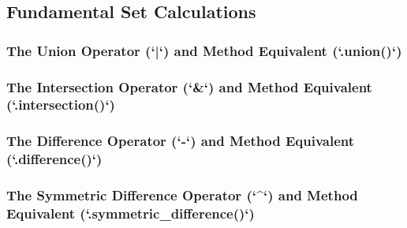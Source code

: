 \subsection{Fundamental Set Calculations}
\subsubsection{The Union Operator (`|`) and Method Equivalent (`.union()`)}
\subsubsection{The Intersection Operator (`&`) and Method Equivalent (`.intersection()`)}
\subsubsection{The Difference Operator (`-`) and Method Equivalent (`.difference()`)}
\subsubsection{The Symmetric Difference Operator (`^`) and Method Equivalent (`.symmetric_difference()`)}
